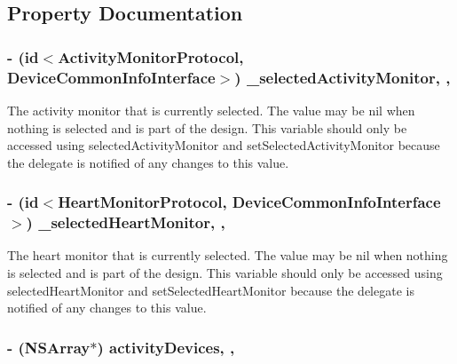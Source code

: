 \subsection{Property Documentation}
\hypertarget{interface_b_t_device_manager_a53a05cc87797350638a2b82c337eb854}{
\subsubsection[{\-\_\-selected\-Activity\-Monitor}]{\setlength{\rightskip}{0pt plus 5cm}-\/ (id$<${\bf Activity\-Monitor\-Protocol}, {\bf Device\-Common\-Info\-Interface}$>$) \-\_\-selected\-Activity\-Monitor\hspace{0.3cm}{\ttfamily [read]}, {\ttfamily [write]}, {\ttfamily [atomic]}}}\label{interface_b_t_device_manager_a53a05cc87797350638a2b82c337eb854}
The activity monitor that is currently selected. The value may be nil when nothing is selected and is part of the design. This variable should only be accessed using selected\-Activity\-Monitor and set\-Selected\-Activity\-Monitor because the delegate is notified of any changes to this value. \hypertarget{interface_b_t_device_manager_ab303b2617a6391db56c3b61f217f9b6b}{
\subsubsection[{\-\_\-selected\-Heart\-Monitor}]{\setlength{\rightskip}{0pt plus 5cm}-\/ (id$<${\bf Heart\-Monitor\-Protocol}, {\bf Device\-Common\-Info\-Interface}$>$) \-\_\-selected\-Heart\-Monitor\hspace{0.3cm}{\ttfamily [read]}, {\ttfamily [write]}, {\ttfamily [atomic]}}}\label{interface_b_t_device_manager_ab303b2617a6391db56c3b61f217f9b6b}
The heart monitor that is currently selected. The value may be nil when nothing is selected and is part of the design. This variable should only be accessed using selected\-Heart\-Monitor and set\-Selected\-Heart\-Monitor because the delegate is notified of any changes to this value. \hypertarget{interface_b_t_device_manager_a8f6f577bb25b7dcd8b3857d6497bff4e}{
\subsubsection[{activity\-Devices}]{\setlength{\rightskip}{0pt plus 5cm}-\/ (N\-S\-Array$\ast$) activity\-Devices\hspace{0.3cm}{\ttfamily [read]}, {\ttfamily [write]}, {\ttfamily [atomic]}}}\label{interface_b_t_device_manager_a8f6f577bb25b7dcd8b3857d6497bff4e}
